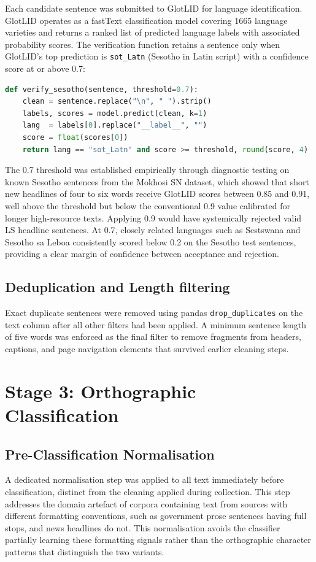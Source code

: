 \documentclass[12pt]{ThesisRU}
\begin{document}
Each candidate sentence was submitted to GlotLID \citep{kargaran2024glotcc} for language identification. GlotLID operates as a fastText classification model covering 1665 language varieties and returns a ranked list of predicted language labels with associated probability scores. The verification function retains a sentence only when GlotLID's top prediction is \texttt{sot\_Latn} (Sesotho in Latin script) with a confidence score at or above 0.7: 

\begin{lstlisting}[language=Python, caption={GlotLID language verification function.}, label={lst:glotlid}]
def verify_sesotho(sentence, threshold=0.7):
    clean = sentence.replace("\n", " ").strip()
    labels, scores = model.predict(clean, k=1)
    lang  = labels[0].replace("__label__", "")
    score = float(scores[0])
    return lang == "sot_Latn" and score >= threshold, round(score, 4)
\end{lstlisting}


The 0.7 threshold was established empirically through diagnostic testing on known Sesotho sentences from the Mokhosi SN dataset, which showed that short new headlines of four to six words receive GlotLID scores between 0.85 and 0.91, well above the threshold but below the conventional 0.9 value calibrated for longer high-resource texts. Applying 0.9 would have systemically rejected valid LS headline sentences. At 0.7, closely related languages such as Sestswana and Sesotho sa Leboa consistently scored below 0.2 on the Sesotho test sentences, providing a clear margin of confidence between acceptance and rejection.

\subsection{Deduplication and Length filtering}

Exact duplicate sentences were removed using pandas \texttt{drop\_duplicates} on the text column after all other filters had been applied. A minimum sentence length of five words was enforced as the final filter to remove fragments from headers, captions, and page navigation elements that survived earlier cleaning steps.


\section{Stage 3: Orthographic Classification}

\subsection{Pre-Classification Normalisation}
A dedicated normalisation step was applied to all text immediately before classification, distinct from the cleaning applied during collection. This step addresses the domain artefact of corpora containing text from sources with different formatting conventions, such as government prose sentences having full stops, and news headlines do not. This normalisation avoids the classifier partially learning these formatting signals rather than the orthographic character patterns that distinguish the two variants.
\end{document}
